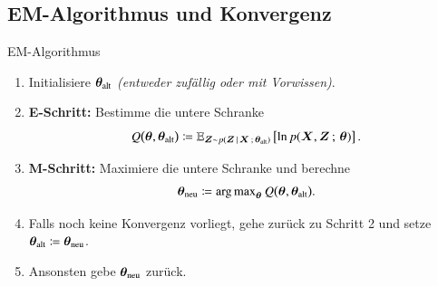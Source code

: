 \subsection{EM-Algorithmus und Konvergenz}

\begin{frame}{EM-Algorithmus}{}
	\begin{myalg}
		\begin{enumerate}
			\item Initialisiere $\bm{\theta}_{\text{alt}}$ \textit{(entweder zufällig oder mit Vorwissen)}.
			\item \textbf{E-Schritt:} Bestimme die untere Schranke
			\begin{equation*}
				Q\bigl( \bm{\theta}, \bm{\theta}_{\text{alt}} \bigr) \coloneqq \mathbb{E}_{\bm{Z} \sim p(\bm{Z}\,\mid\,\bm{X} \,;\, \bm{\theta}_{\text{alt}})}\left[ \ln p(\bm{X}, \bm{Z} \,;\, \bm{\theta}) \right].
			\end{equation*}
			\item \textbf{M-Schritt:} Maximiere die untere Schranke und berechne
			\begin{equation*}
				\bm{\theta}_{\text{neu}} \coloneqq \operatorname{arg\,max}_{\bm{\theta}} Q\bigl( \bm{\theta}, \bm{\theta}_{\text{alt}} \bigr).
			\end{equation*}
			\item Falls noch keine Konvergenz vorliegt, gehe zurück zu Schritt 2 und setze $\bm{\theta}_{\text{alt}} \coloneqq \bm{\theta}_{\text{neu}}$.
			\item Ansonsten gebe $\bm{\theta}_{\text{neu}}$ zurück.
		\end{enumerate}
	\end{myalg}
\end{frame}


